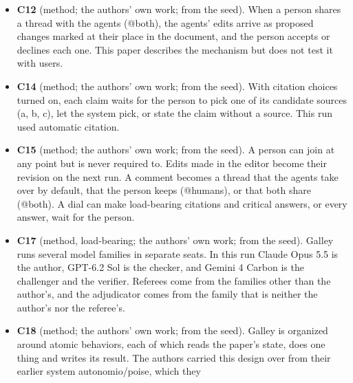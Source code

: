 \documentclass[
]{article}
\begin{document}
\begin{itemize}
  \textbf{C11} (method, load-bearing; the authors' own work; from the
  seed). Peer review is run by agents from different families. Referee
  seats for methods, the host field, citations and the desk editor are
  drawn from families other than the author's and rotated between
  rounds, and each finding they raise carries a severity. The author
  answers each material finding by fixing it with exact edits, rebutting
  it, stating it as a limitation, or asking for new evidence. The
  referee who raised the finding judges the answer. If a finding is
  still disputed after a cap of answers (three in this run), a third
  family adjudicates. This run used two referee rounds, and every
  exchange is kept in the journal.
\item
  \textbf{C12} (method; the authors' own work; from the seed). When a
  person shares a thread with the agents (@both), the agents' edits
  arrive as proposed changes marked at their place in the document, and
  the person accepts or declines each one. This paper describes the
  mechanism but does not test it with users.
\item
  \textbf{C14} (method; the authors' own work; from the seed). With
  citation choices turned on, each claim waits for the person to pick
  one of its candidate sources (a, b, c), let the system pick, or state
  the claim without a source. This run used automatic citation.
\item
  \textbf{C15} (method; the authors' own work; from the seed). A person
  can join at any point but is never required to. Edits made in the
  editor become their revision on the next run. A comment becomes a
  thread that the agents take over by default, that the person keeps
  (@humans), or that both share (@both). A dial can make load-bearing
  citations and critical answers, or every answer, wait for the person.
\item
  \textbf{C17} (method, load-bearing; the authors' own work; from the
  seed). Galley runs several model families in separate seats. In this
  run Claude Opus 5.5 is the author, GPT-6.2 Sol is the checker, and
  Gemini 4 Carbon is the challenger and the verifier. Referees come from
  the families other than the author's, and the adjudicator comes from
  the family that is neither the author's nor the referee's.
\item
  \textbf{C18} (method; the authors' own work; from the seed). Galley is
  organized around atomic behaviors, each of which reads the paper's
  state, does one thing and writes its result. The authors carried this
  design over from their earlier system autonomio/poise, which they

\end{itemize}
\end{document}
